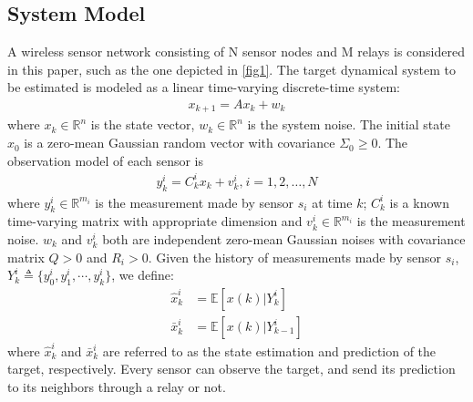\documentclass[twocolumn]{IEEEtran}
\begin{document}
\subsection{System Model}
A wireless sensor network consisting of N sensor nodes and M relays is considered in this paper, such as the one depicted in \ref{fig1}. The target dynamical system to be estimated is modeled as a linear time-varying discrete-time system:
\begin{equation}\label{target}
\begin{split}
        x_{k+1} = A x_k + w_k 
\end{split}
\end{equation}
where $x_k \in \mathbb{R}^{n}$ is the state vector,  $w_k \in \mathbb{R}^{n}$ is the system noise. The initial state $x_{0}$ is a zero-mean Gaussian random vector with covariance $\Sigma_{0}\geq0$. The observation model of each sensor is
\begin{equation}\label{measurement}
\begin{split}
     y^{i}_{k}= C_{k}^{i} x_k + v^{i}_{k} \text{,}~ i = 1, 2, \dots, N
\end{split}
\end{equation}
where $y^{i}_{k} \in \mathbb{R}^{m_i}$ is the measurement made by sensor $s_{i}$ at time $k$; $C_{k}^{i}$ is a known time-varying matrix with appropriate dimension and $v^{i}_{k} \in \mathbb{R}^{m_i}$ is the measurement noise. $w_k$ and $v^{i}_{k}$ both are independent zero-mean Gaussian noises with covariance matrix $Q > 0$ and $R_{i}> 0$. Given the history of measurements made by sensor $s_{i}$, $Y^{i}_{k}\triangleq\{y^{i}_{0},y^{i}_{1},\cdots,y^{i}_{k}\}$, we define:
\begin{equation}
\begin{split}
\hat{x}^{i}_{k}&=\mathbb{E}[x(k)|Y^{i}_{k}]\\
\bar{x}^{i}_{k}&=\mathbb{E}[x(k)|Y^{i}_{k-1}]
\end{split}
\end{equation}
where $\hat{x}^{i}_{k}$ and $\bar{x}^{i}_{k}$ are referred to as the state estimation and prediction of the target, respectively. Every sensor can observe the target, and send its prediction to its neighbors through a relay or not.

 
\end{document}
